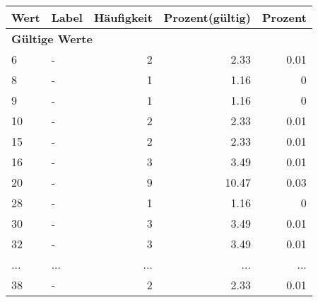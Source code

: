      \begin{longtable}{lXrrr}
     \toprule
     \textbf{Wert} & \textbf{Label} & \textbf{Häufigkeit} & \textbf{Prozent(gültig)} & \textbf{Prozent} \\
     \endhead
     \midrule
     \multicolumn{5}{l}{\textbf{Gültige Werte}}\\
        6 & \multicolumn{1}{X}{-} & %
          \num{2} &
          \num[round-mode=places,round-precision=2]{2,33} &
          \num[round-mode=places,round-precision=2]{0,01} \\
        8 & \multicolumn{1}{X}{-} & %
          \num{1} &
          \num[round-mode=places,round-precision=2]{1,16} &
          \num[round-mode=places,round-precision=2]{0} \\
        9 & \multicolumn{1}{X}{-} & %
          \num{1} &
          \num[round-mode=places,round-precision=2]{1,16} &
          \num[round-mode=places,round-precision=2]{0} \\
        10 & \multicolumn{1}{X}{-} & %
          \num{2} &
          \num[round-mode=places,round-precision=2]{2,33} &
          \num[round-mode=places,round-precision=2]{0,01} \\
        15 & \multicolumn{1}{X}{-} & %
          \num{2} &
          \num[round-mode=places,round-precision=2]{2,33} &
          \num[round-mode=places,round-precision=2]{0,01} \\
        16 & \multicolumn{1}{X}{-} & %
          \num{3} &
          \num[round-mode=places,round-precision=2]{3,49} &
          \num[round-mode=places,round-precision=2]{0,01} \\
        20 & \multicolumn{1}{X}{-} & %
          \num{9} &
          \num[round-mode=places,round-precision=2]{10,47} &
          \num[round-mode=places,round-precision=2]{0,03} \\
        28 & \multicolumn{1}{X}{-} & %
          \num{1} &
          \num[round-mode=places,round-precision=2]{1,16} &
          \num[round-mode=places,round-precision=2]{0} \\
        30 & \multicolumn{1}{X}{-} & %
          \num{3} &
          \num[round-mode=places,round-precision=2]{3,49} &
          \num[round-mode=places,round-precision=2]{0,01} \\
        32 & \multicolumn{1}{X}{-} & %
          \num{3} &
          \num[round-mode=places,round-precision=2]{3,49} &
          \num[round-mode=places,round-precision=2]{0,01} \\
       ... & ... & ... & ... & ... \\
        38 & \multicolumn{1}{X}{-} & %
          \num{2} &
          \num[round-mode=places,round-precision=2]{2,33} &
          \num[round-mode=places,round-precision=2]{0,01} \\


\end{longtable}
